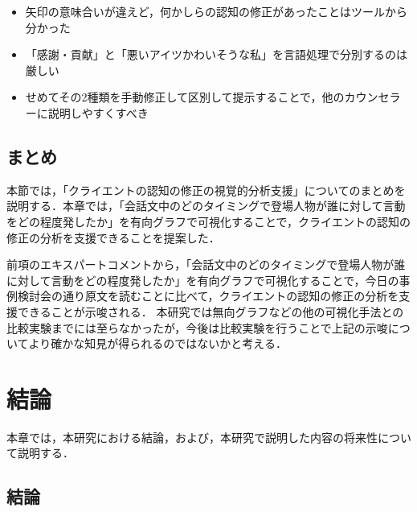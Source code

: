 \documentclass[shuuron]{kuee}
\begin{document}
\begin{itemize}

  \item 矢印の意味合いが違えど，何かしらの認知の修正があったことはツールから分かった
  \item 「感謝・貢献」と「悪いアイツかわいそうな私」を言語処理で分別するのは厳しい

  \item せめてその2種類を手動修正して区別して提示することで，他のカウンセラーに説明しやすくすべき

\end{itemize}

\section{まとめ}%
本節では，「クライエントの認知の修正の視覚的分析支援」についてのまとめを説明する．本章では，「会話文中のどのタイミングで登場人物が誰に対して言動をどの程度発したか」を有向グラフで可視化することで，クライエントの認知の修正の分析を支援できることを提案した．

前項のエキスパートコメントから，「会話文中のどのタイミングで登場人物が誰に対して言動をどの程度発したか」を有向グラフで可視化することで，今日の事例検討会の通り原文を読むことに比べて，クライエントの認知の修正の分析を支援できることが示唆される．
本研究では無向グラフなどの他の可視化手法との比較実験までには至らなかったが，今後は比較実験を行うことで上記の示唆についてより確かな知見が得られるのではないかと考える．


\chapter{結論}%

本章では，本研究における結論，および，本研究で説明した内容の将来性について説明する．

\section{結論}
\end{document}
